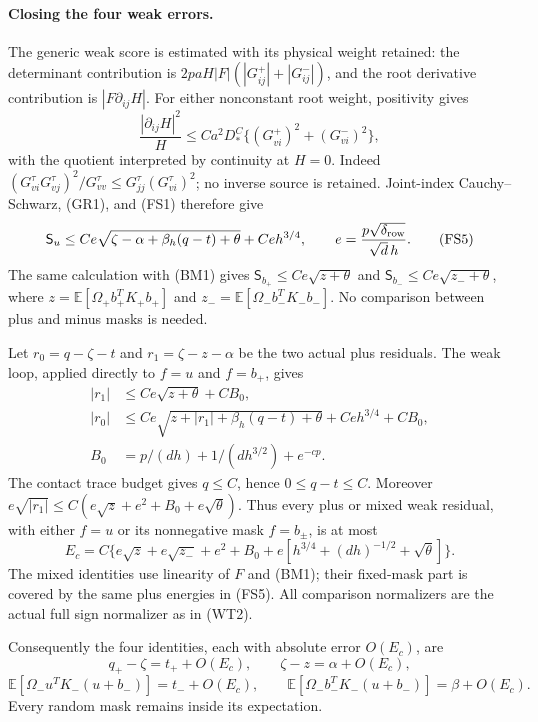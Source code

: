 \documentclass[10pt]{article}
\numberwithin{equation}{section}
\newcommand{\1}{\mathbf1}
\begin{document}
\paragraph{Closing the four weak errors.}
The generic weak score is estimated with its physical weight retained:
the determinant contribution is $2paH|F|(|G^+_{ij}|+|G^-_{ij}|)$,
and the root derivative contribution is $|F\partial_{ij}H|$.
For either nonconstant root weight, positivity gives
\[
 \frac{|\partial_{ij}H|^2}{H}
 \le Ca^2D_*^C\{(G^+_{vi})^2+(G^-_{vi})^2\},
 \tag{FS4}
\]
with the quotient interpreted by continuity at $H=0$.
Indeed $(G^\tau_{vi}G^\tau_{vj})^2/G^\tau_{vv}
\le G^\tau_{jj}(G^\tau_{vi})^2$; no inverse source is retained.
Joint-index Cauchy--Schwarz, (GR1), and (FS1) therefore give
\[
 \mathsf S_u\le
 Ce\sqrt{\zeta-\alpha+\beta_h(q-t)+\theta}+Ce h^{3/4},
 \qquad e=\frac{p\sqrt{\delta_{\rm row}}}{\sqrt d\,h}.
 \tag{FS5}
\]
The same calculation with (BM1) gives
$\mathsf S_{b_+}\le Ce\sqrt{z+\theta}$ and
$\mathsf S_{b_-}\le Ce\sqrt{z_-+\theta}$, where
$z=\mathbb E[\Omega_+b_+^TK_+b_+]$ and
$z_-=\mathbb E[\Omega_-b_-^TK_-b_-]$.
No comparison between plus and minus masks is needed.

Let $r_0=q-\zeta-t$ and $r_1=\zeta-z-\alpha$ be the two actual
plus residuals. The weak loop, applied directly to $f=u$ and $f=b_+$,
gives
\[
 \begin{split}
 |r_1|&\le Ce\sqrt{z+\theta}+CB_0,\\
 |r_0|&\le Ce\sqrt{z+|r_1|+\beta_h(q-t)+\theta}
                                      +Ce h^{3/4}+CB_0,\\
 B_0&=p/(dh)+1/(dh^{3/2})+e^{-cp}.
 \end{split}\tag{FS6}
\]
The contact trace budget gives $q\le C$, hence $0\le q-t\le C$.
Moreover $e\sqrt{|r_1|}\le C(e\sqrt z+e^2+B_0+e\sqrt\theta)$.
Thus every plus or mixed weak residual, with either $f=u$ or its
nonnegative mask $f=b_\pm$, is at most
\[
 E_c=C\{e\sqrt z+e\sqrt{z_-}+e^2+B_0
                  +e[h^{3/4}+(dh)^{-1/2}+\sqrt\theta]\}.
 \tag{FS7}
\]
The mixed identities use linearity of $F$ and (BM1); their fixed-mask
part is covered by the same plus energies in (FS5). All comparison
normalizers are the actual full sign normalizer as in (WT2).

Consequently the four identities, each with absolute error $O(E_c)$, are
\[
 q_+-\zeta=t_++O(E_c),\qquad \zeta-z=\alpha+O(E_c),
\]
\[
 \mathbb E[\Omega_-u^TK_-(u+b_-)]=t_-+O(E_c),\qquad
 \mathbb E[\Omega_-b_-^TK_-(u+b_-)]=\beta+O(E_c).
\]
Every random mask remains inside its expectation.
\end{document}
